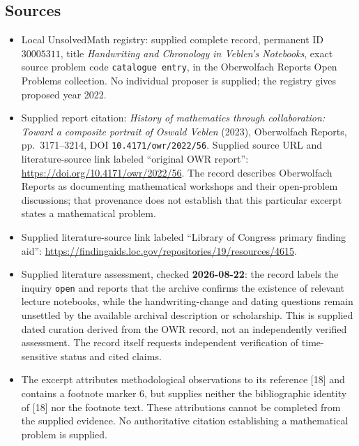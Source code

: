 \documentclass[11pt]{article}
\begin{document}
\subsection{Sources}
\begin{itemize}
\item Local UnsolvedMath registry: supplied complete record, permanent ID \(30005311\), title \emph{Handwriting and Chronology in Veblen's Notebooks}, exact source problem code \texttt{catalogue entry}, in the Oberwolfach Reports Open Problems collection. No individual proposer is supplied; the registry gives proposed year 2022.
\item Supplied report citation: \emph{History of mathematics through collaboration: Toward a composite portrait of Oswald Veblen} (2023), Oberwolfach Reports, pp.\ 3171--3214, DOI \texttt{10.4171/owr/2022/56}. Supplied source URL and literature-source link labeled ``original OWR report'': \url{https://doi.org/10.4171/owr/2022/56}. The record describes Oberwolfach Reports as documenting mathematical workshops and their open-problem discussions; that provenance does not establish that this particular excerpt states a mathematical problem.
\item Supplied literature-source link labeled ``Library of Congress primary finding aid'': \url{https://findingaids.loc.gov/repositories/19/resources/4615}.
\item Supplied literature assessment, checked \textbf{2026-08-22}: the record labels the inquiry \texttt{open} and reports that the archive confirms the existence of relevant lecture notebooks, while the handwriting-change and dating questions remain unsettled by the available archival description or scholarship. This is supplied dated curation derived from the OWR record, not an independently verified assessment. The record itself requests independent verification of time-sensitive status and cited claims.
\item The excerpt attributes methodological observations to its reference [18] and contains a footnote marker 6, but supplies neither the bibliographic identity of [18] nor the footnote text. These attributions cannot be completed from the supplied evidence. No authoritative citation establishing a mathematical problem is supplied.
\end{itemize}
\end{document}
